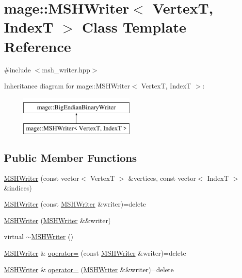 \hypertarget{classmage_1_1_m_s_h_writer}{}\section{mage\+:\+:M\+S\+H\+Writer$<$ VertexT, IndexT $>$ Class Template Reference}
\label{classmage_1_1_m_s_h_writer}


{\ttfamily \#include $<$msh\+\_\+writer.\+hpp$>$}

Inheritance diagram for mage\+:\+:M\+S\+H\+Writer$<$ VertexT, IndexT $>$\+:\begin{figure}[H]
\begin{center}
\leavevmode
\includegraphics[height=2.000000cm]{classmage_1_1_m_s_h_writer}
\end{center}
\end{figure}
\subsection*{Public Member Functions}
\begin{DoxyCompactItemize}
\item 
\hyperlink{classmage_1_1_m_s_h_writer_a4b74333888706ab61c9d6c3b6fefd4c5}{M\+S\+H\+Writer} (const vector$<$ VertexT $>$ \&vertices, const vector$<$ IndexT $>$ \&indices)
\item 
\hyperlink{classmage_1_1_m_s_h_writer_a19c63d56f07d30b8741e899ba81b0c70}{M\+S\+H\+Writer} (const \hyperlink{classmage_1_1_m_s_h_writer}{M\+S\+H\+Writer} \&writer)=delete
\item 
\hyperlink{classmage_1_1_m_s_h_writer_a879475cbe42e24707c384a1c1283aa1c}{M\+S\+H\+Writer} (\hyperlink{classmage_1_1_m_s_h_writer}{M\+S\+H\+Writer} \&\&writer)
\item 
virtual \hyperlink{classmage_1_1_m_s_h_writer_a75e57bab20c8928b230305118bf9aa5f}{$\sim$\+M\+S\+H\+Writer} ()
\item 
\hyperlink{classmage_1_1_m_s_h_writer}{M\+S\+H\+Writer} \& \hyperlink{classmage_1_1_m_s_h_writer_a0c4f9bbd4a62ef60a38b7a75eb21ea26}{operator=} (const \hyperlink{classmage_1_1_m_s_h_writer}{M\+S\+H\+Writer} \&writer)=delete
\item 
\hyperlink{classmage_1_1_m_s_h_writer}{M\+S\+H\+Writer} \& \hyperlink{classmage_1_1_m_s_h_writer_ad8c9302c6335684ea28d4e47c81a1afb}{operator=} (\hyperlink{classmage_1_1_m_s_h_writer}{M\+S\+H\+Writer} \&\&writer)=delete
\end{DoxyCompactItemize}
